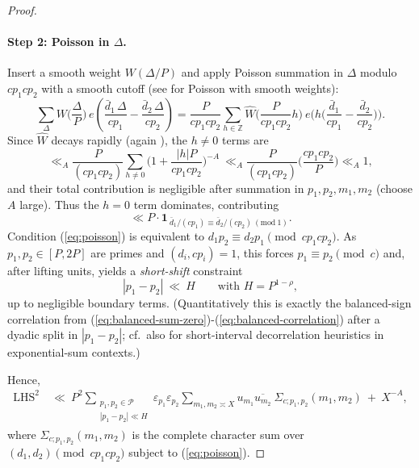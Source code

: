 \documentclass[11pt]{article}
\def\eqref#1{(\ref{#1})}%
\theoremstyle{definition}
\theoremstyle{remark}
\numberwithin{equation}{part}
\begin{document}
\begin{proof}
	\paragraph{Step 2: Poisson in $\Delta$.}
	Insert a smooth weight $W(\Delta/P)$ and apply Poisson summation in $\Delta$ modulo $cp_1cp_2$ with a smooth cutoff (see \cite[Ch.~4]{IK} for Poisson with smooth weights):
	\[
		\sum_{\Delta} W\!\Big(\frac{\Delta}{P}\Big)\,e\!\left(\frac{\bar d_1\,\Delta}{cp_1}-\frac{\bar d_2\,\Delta}{cp_2}\right)
		= \frac{P}{cp_1cp_2}\sum_{h\in\mathbb Z} \widehat W\!\Big(\frac{P}{cp_1cp_2}h\Big)\ e\!\Big(h\Big(\frac{\bar d_1}{cp_1}-\frac{\bar d_2}{cp_2}\Big)\Big).
	\]
	Since $\widehat W$ decays rapidly (again \cite[Ch.~4]{IK}), the $h\neq 0$ terms are
	\[
		\ll_A \frac{P}{(cp_1cp_2)} \sum_{h\neq 0} \Big(1+\frac{|h|P}{cp_1cp_2}\Big)^{-A} \ \ll_A \frac{P}{(cp_1cp_2)} \Big(\frac{cp_1cp_2}{P}\Big) \ll_A 1,
	\]
	and their total contribution is negligible after summation in $p_1,p_2,m_1,m_2$ (choose $A$ large).
	Thus the $h=0$ term dominates, contributing
	\begin{equation}\label{eq:poisson}
		\ll P\cdot \mathbf 1_{\ \bar d_1/(cp_1)\equiv \bar d_2/(cp_2)\ (\mathrm{mod}\ 1)} .
	\end{equation}
	Condition \eqref{eq:poisson} is equivalent to $d_1p_2 \equiv d_2p_1\pmod{cp_1cp_2}$.
	As $p_1,p_2\in [P,2P]$ are primes and $(d_i,cp_i)=1$, this forces $p_1\equiv p_2 \pmod{c}$ and, after lifting units, yields a \emph{short-shift} constraint
	\begin{equation}\label{eq:shortshift}
		|p_1-p_2|\ \ll\ H \qquad\text{with } H=P^{1-\rho},
	\end{equation}
	up to negligible boundary terms.
	(Quantitatively this is exactly the balanced-sign correlation from \eqref{eq:balanced-sum-zero}-\eqref{eq:balanced-correlation} after a dyadic split in $|p_1-p_2|$; cf.\ also \cite[Ch.~2]{GrahamKolesnik} for short-interval decorrelation heuristics in exponential-sum contexts.)

	Hence,
	\begin{align}
		\text{LHS}^2\  & \ll\ P^2 \sum_{\substack{p_1,p_2\in\mathcal P \\ |p_1-p_2|\ll H}} \varepsilon_{p_1}\varepsilon_{p_2}
		\sum_{m_1,m_2\asymp X} u_{m_1}\overline{u_{m_2}}\ \Sigma_{c;p_1,p_2}(m_1,m_2) \ +\ X^{-A},
		\label{eq:lhs2-short}
	\end{align}
	where $\Sigma_{c;p_1,p_2}(m_1,m_2)$ is the complete character sum over $(d_1,d_2)\!\!\pmod{cp_1cp_2}$ subject to \eqref{eq:poisson}.


\end{proof}
\end{document}
